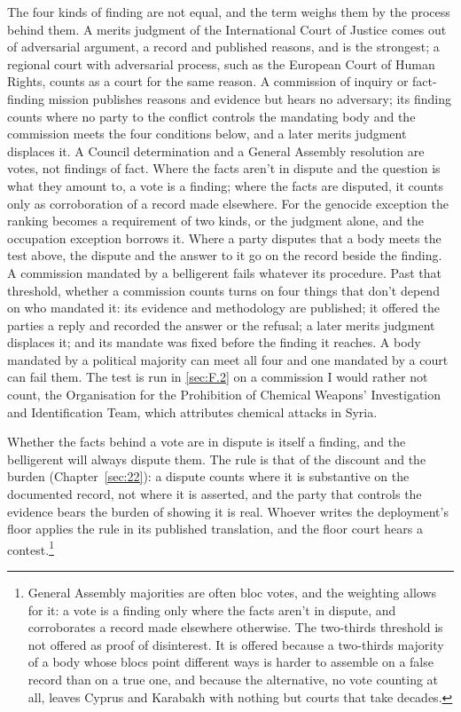 The four kinds of finding are not equal, and the term weighs them by the process behind them. A merits judgment of the International Court of Justice comes out of adversarial argument, a record and published reasons, and is the strongest; a regional court with adversarial process, such as the European Court of Human Rights, counts as a court for the same reason. A commission of inquiry or fact-finding mission publishes reasons and evidence but hears no adversary; its finding counts where no party to the conflict controls the mandating body and the commission meets the four conditions below, and a later merits judgment displaces it. A Council determination and a General Assembly resolution are votes, not findings of fact. Where the facts aren't in dispute and the question is what they amount to, a vote is a finding; where the facts are disputed, it counts only as corroboration of a record made elsewhere. For the genocide exception the ranking becomes a requirement of two kinds, or the judgment alone, and the occupation exception borrows it. Where a party disputes that a body meets the test above, the dispute and the answer to it go on the record beside the finding. A commission mandated by a belligerent fails whatever its procedure. Past that threshold, whether a commission counts turns on four things that don't depend on who mandated it: its evidence and methodology are published; it offered the parties a reply and recorded the answer or the refusal; a later merits judgment displaces it; and its mandate was fixed before the finding it reaches. A body mandated by a political majority can meet all four and one mandated by a court can fail them. The test is run in \ref{sec:F.2} on a commission I would rather not count, the Organisation for the Prohibition of Chemical Weapons' Investigation and Identification Team, which attributes chemical attacks in Syria.

Whether the facts behind a vote are in dispute is itself a finding, and the belligerent will always dispute them. The rule is that of the discount and the burden (Chapter~\ref{sec:22}): a dispute counts where it is substantive on the documented record, not where it is asserted, and the party that controls the evidence bears the burden of showing it is real. Whoever writes the deployment's floor applies the rule in its published translation, and the floor court hears a contest.\footnote{General Assembly majorities are often bloc votes, and the weighting allows for it: a vote is a finding only where the facts aren't in dispute, and corroborates a record made elsewhere otherwise. The two-thirds threshold is not offered as proof of disinterest. It is offered because a two-thirds majority of a body whose blocs point different ways is harder to assemble on a false record than on a true one, and because the alternative, no vote counting at all, leaves Cyprus and Karabakh with nothing but courts that take decades.}
